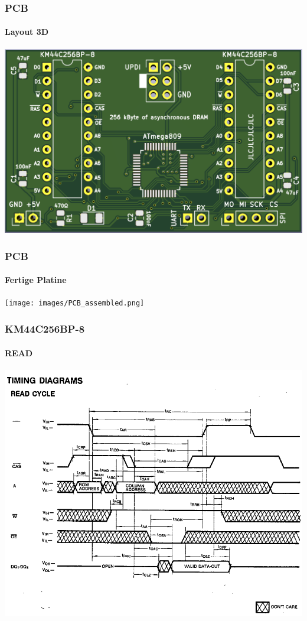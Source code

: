 \documentclass{beamer}
\begin{document}
\begin{frame}

	\frametitle{PCB}
	\framesubtitle{Layout 3D}
	\begin{center}
		\includegraphics[scale=0.15]{images/KiCAD_3D_PCB_View.png}
	\end{center}
	
\end{frame}

\begin{frame}

	\frametitle{PCB}
	\framesubtitle{Fertige Platine}
	\begin{center}
		\texttt{[image: images/PCB\_assembled.png]}
	\end{center}
	
\end{frame}

\begin{frame}

	\frametitle{KM44C256BP-8}
	\framesubtitle{READ}
	\begin{center}
		\includegraphics[scale=0.35]{images/DRAM_Read_Cycle.png}
	\end{center}
	
\end{frame}
\end{document}
